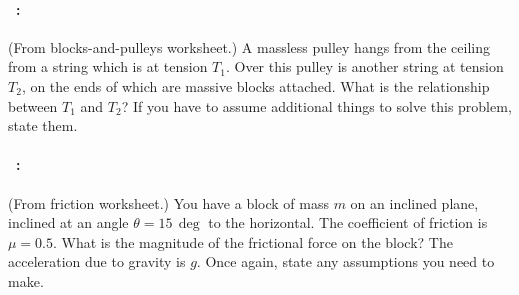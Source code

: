 \documentclass[12pt]{article}
\begin{document}
\vfill

\paragraph{\problemname~\theproblem:}%
(From blocks-and-pulleys worksheet.) A massless pulley hangs from the
ceiling from a string which is at tension $T_1$. Over this pulley is another
string at tension $T_2$, on the ends of which are massive blocks attached. What is the
relationship between $T_1$ and $T_2$? If you have to assume additional things to
solve this problem, state them.

\vfill

\paragraph{\problemname~\theproblem:}%
(From friction worksheet.) You have a block of mass $m$ on an inclined
plane, inclined at an angle $\theta=15\,\deg$ to the horizontal. The
coefficient of friction is $\mu=0.5$. What is the magnitude of the
frictional force on the block? The acceleration due to gravity is $g$.
Once again, state any assumptions you need to make.

\vfill
~
\end{document}
